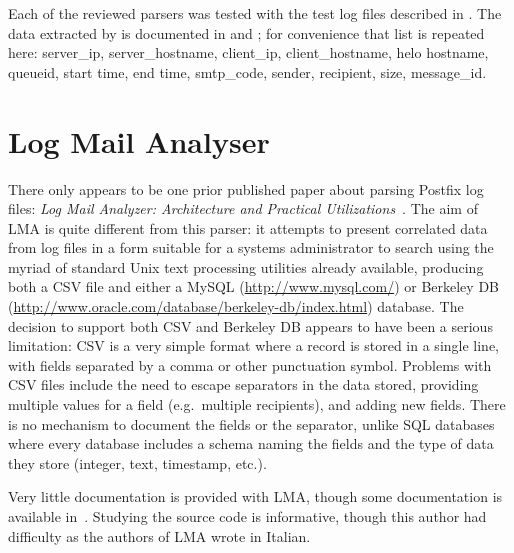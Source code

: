 Each of the reviewed parsers was tested with the \numberOFlogFILES{} test
log files described in .  The data extracted
by \parsername{} is documented in  and
; for convenience that list is repeated here:
server\_ip, server\_hostname, client\_ip, client\_hostname, helo hostname,
queueid, start time, end time, smtp\_code, sender, recipient, size,
message\_id.

\section{Log Mail Analyser}

\label{prior art}

There only appears to be one prior published paper about parsing Postfix
log files: \textit{Log Mail Analyzer: Architecture and Practical
Utilizations\/}~\cite{log-mail-analyser}.  The aim of \gls{LMA} is quite
different from this parser: it attempts to present correlated data from log
files in a form suitable for a systems administrator to search using the
myriad of standard Unix text processing utilities already available,
producing both a \gls{CSV} file and either a MySQL
(\url{http://www.mysql.com/}) or Berkeley DB
(\url{http://www.oracle.com/database/berkeley-db/index.html}) database.
The decision to support both \gls{CSV} and Berkeley DB appears to have been
a serious limitation: \gls{CSV} is a very simple format where a record is
stored in a single line, with fields separated by a comma or other
punctuation symbol.  Problems with \gls{CSV} files include the need to
escape separators in the data stored, providing multiple values for a field
(e.g.\ multiple recipients), and adding new fields.  There is no mechanism
to document the fields or the separator, unlike \gls{SQL} databases where
every database includes a schema naming the fields and the type of data
they store (integer, text, timestamp, etc.).

Very little documentation is provided with \gls{LMA}, though some
documentation is available in~\cite{log-mail-analyser}.  Studying the
source code is informative, though this author had difficulty as the
authors of \gls{LMA} wrote in Italian.

